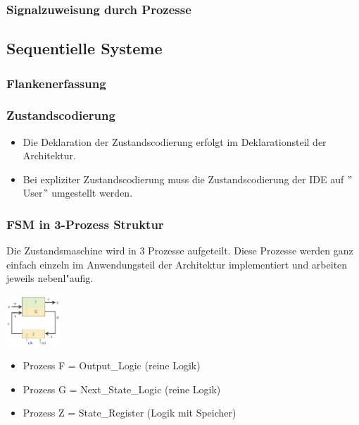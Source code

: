 \begin{multicols}{2}
	\subsubsection{Signalzuweisung durch Prozesse}
	
\end{multicols}
		
\begin{multicols}{2}
	\subsection{Sequentielle Systeme}
	\subsubsection{Flankenerfassung}
		
	\subsubsection{Zustandscodierung}
	\begin{itemize}
	\itemsep0em
		\item Die Deklaration der Zustandscodierung erfolgt im Deklarationsteil der Architektur.
		\item Bei expliziter Zustandscodierung muss die Zustandscodierung der IDE auf $"$User$"$ umgestellt werden.
	\end{itemize}
	
\end{multicols}
			
\begin{multicols}{3}
	\subsubsection{FSM in 3-Prozess Struktur}
	Die Zustandsmaschine wird in 3 Prozesse aufgeteilt. Diese Prozesse werden ganz einfach einzeln im Anwendungsteil der Architektur implementiert und arbeiten jeweils nebenl"aufig.
	\begin{center}
		\includegraphics[width=0.15\textwidth]{pics/fsmprocesslogic}
	\end{center}
	\begin{itemize}
	\itemsep0em
		\item Prozess F = Output\_Logic (reine Logik)
		\item Prozess G = Next\_State\_Logic (reine Logik)
		\item Prozess Z = State\_Register (Logik mit Speicher)
	\end{itemize}
\end{multicols}

